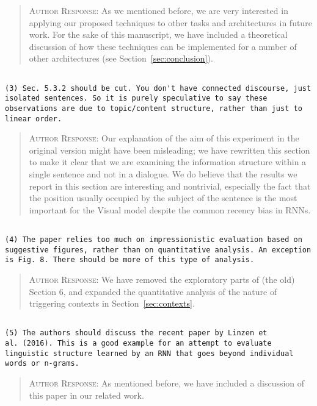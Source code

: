 \begin{quote}
\textsc{Author Response:}  As we mentioned before, we are very interested in 
applying our proposed techniques to other tasks and architectures in future work. 
For the sake of this manuscript, we have included a theoretical discussion of how 
these techniques can be implemented for a number of other architectures (see 
Section~\ref{sec:conclusion}).
\end{quote}
\begin{verbatim}

(3) Sec. 5.3.2 should be cut. You don't have connected discourse, just
isolated sentences. So it is purely speculative to say these
observations are due to topic/content structure, rather than just to
linear order.
\end{verbatim}  
\begin{quote}
\textsc{Author Response:}  Our explanation of the aim of this experiment in the original version might have been misleading; we have rewritten this section to make it clear that we are examining the information structure within a single sentence and not in a dialogue. We do believe that the results we report in this section are interesting and nontrivial, especially the fact that the position usually occupied by the subject of the sentence is the most important for the {\sc Visual} model despite the common recency bias in RNNs.
\end{quote}
\begin{verbatim}

(4) The paper relies too much on impressionistic evaluation based on
suggestive figures, rather than on quantitative analysis. An exception
is Fig. 8. There should be more of this type of analysis.
\end{verbatim}  
\begin{quote}
\textsc{Author Response:}  We have removed the exploratory parts of (the old) Section 6, and expanded the quantitative analysis of the nature of triggering contexts in Section~\ref{sec:contexts}. 
\end{quote}
\begin{verbatim}

(5) The authors should discuss the recent paper by Linzen et
al. (2016). This is a good example for an attempt to evaluate
linguistic structure learned by an RNN that goes beyond individual
words or n-grams.
\end{verbatim}  
\begin{quote}
\textsc{Author Response:}  As mentioned before, we have included a discussion of
this paper in our related work.
\end{quote}
